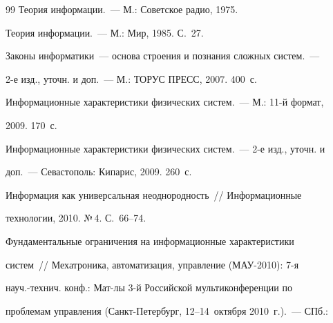 {{\begin{thebibliography}{99}
Теория информации.~--- М.: Советское радио, 1975.









Теория информации.~--- М.: Мир, 1985. С.~27.









Законы информатики~--- основа строения и познания сложных систем.~--- 


2-е изд., уточн. и доп.~--- М.: ТОРУС ПРЕСС, 2007. 400~с.









Информационные характеристики физических систем.~--- М.: 11-й формат, 


2009. 170~с.









Информационные характеристики физических систем.~---  2-е изд., уточн. и 


доп.~--- Севастополь: Кипарис, 2009. 260~с.









Информация как универсальная неоднородность~/\!\!/ Информационные 


технологии, 2010. №\,4. С.~66--74.









Фундаментальные ограничения на информационные характеристики 


систем~/\!\!/ Мехатроника, автоматизация, управление (МАУ-2010): 7-я 


науч.-технич. конф.: Мат-лы 3-й Российской мультиконференции по 


проблемам управ\-ле\-ния (Санкт-Петербург, 12--14~октября 2010~г.).~--- СПб.: 



\end{thebibliography}}}
